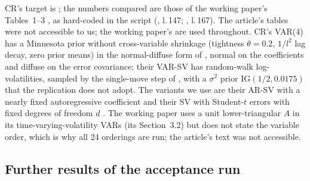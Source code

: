 CR's target is \citet{clark2015macroeconomic}; the numbers compared are those of the working paper's
Tables~1--3 \citep{clark2012macroeconomic}, as hard-coded in the script (, l.\,147;
, l.\,167).
The article's tables were not accessible to us; the working paper's are used throughout.
CR's VAR(4) has a Minnesota prior without cross-variable shrinkage (tightness $\theta = 0.2$,
$1/l^2$ lag decay, zero prior means) in the normal-diffuse form of \citet{kadiyala1997numerical},
normal on the coefficients and diffuse on the error covariance; their VAR-SV has random-walk
log-volatilities, sampled by the single-move step of \citet{jacquier1994bayesian}, with a $\sigma^2$
prior $\mathrm{IG}(1/2, 0.0175)$ that the replication does not adopt.
The variants we use are their AR-SV with a nearly fixed autoregressive coefficient and their SV with
Student-$t$ errors with fixed degrees of freedom $d$ \citep{jacquier2004bayesian}. %
The working paper uses a unit lower-triangular $A$ in its time-varying-volatility VARs (its
Section~3.2) but does not state the variable order, which is why all 24 orderings are run; the
article's text was not accessible.

\subsection{Further results of the acceptance run}\label{app:cr-results}

